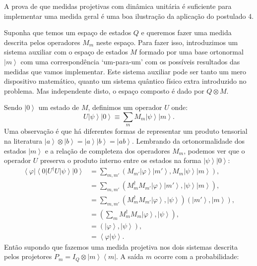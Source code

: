A prova de que medidas projetivas com dinâmica unitária é suficiente para implementar uma medida geral é uma boa ilustração da aplicação do postulado 4.

Suponha que temos um espaço de estados $Q$  e queremos fazer uma medida descrita pelos operadores $M_{m}$ neste espaço. Para fazer isso, introduzimos um sistema auxiliar com o espaço de estados $M$ formado por uma base ortonormal  $\left|m\right\rangle $ com uma correspondência `um-para-um' com os possíveis resultados das medidas que vamos implementar. Este sistema auxiliar pode ser tanto um mero dispositivo matemático, quanto um sistema quântico físico extra introduzido no problema. Mas independente disto, o  espaço composto é dado por $Q\otimes M$.

Sendo $\left|0\right\rangle $ um estado de $M$, definimos um operador $U$ onde:
\begin{equation}
U\left|\psi\right\rangle \left|0\right\rangle \equiv\sum_{m}M_{m}\left|\psi\right\rangle \left|m\right\rangle 
. \end{equation}
Uma observação é que há diferentes formas de representar um produto tensorial na literatura $\left|a\right\rangle \otimes\left|b\right\rangle =\left|a\right\rangle \left|b\right\rangle =\left|ab\right\rangle $. Lembrando da ortonormalidade dos estados $\left|m\right\rangle $ e a relação de completeza dos operadores $M_m$, podemos ver que o operador $U$ preserva o produto interno entre os estados na forma $\left|\psi\right\rangle \left|0\right\rangle $:
\begin{equation}
\begin{split}
\left\langle \varphi\right|\left\langle 0\right|U^{\dagger}U\left|\psi\right\rangle \left|0\right\rangle &  =\sum_{m,m'}\left(M_{m'}\left|\varphi\right\rangle \left|m'\right\rangle ,M_{m}\left|\psi\right\rangle \left|m\right\rangle \right), \\
& = \sum_{m,m'}\left(M_{m}^{\dagger}M_{m'}\left|\varphi\right\rangle \left|m'\right\rangle ,\left|\psi\right\rangle \left|m\right\rangle \right),\\
& = \sum_{m,m'}\left(M_{m}^{\dagger}M_{m'}\left|\varphi\right\rangle ,\left|\psi\right\rangle \right)\left(\left|m'\right\rangle ,\left|m\right\rangle \right),\\
& = \left(\sum_{m}M_{m}^{\dagger}M_{m}\left|\varphi\right\rangle ,\left|\psi\right\rangle \right), \\
& = \left(\left|\varphi\right\rangle ,\left|\psi\right\rangle \right), \\
& = \left\langle \varphi|\psi\right\rangle .
\end{split}
\end{equation}Então supondo que fazemos uma medida projetiva nos dois sistemas descrita pelos projetores $P_{m}=I_{Q}\otimes\left|m\right\rangle \left\langle m\right|$. A saída $m$ ocorre com a probabilidade:

